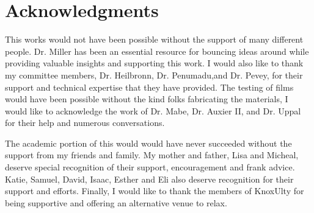 \chapter*{Acknowledgments}

This works would not have been possible without the support of many different people.
Dr. Miller has been an essential resource for bouncing ideas around while providing valuable insights and supporting this work.
I would also like to thank my committee members, Dr. Heilbronn, Dr. Penumadu,and Dr. Pevey, for their support and technical expertise that they have provided. 
The testing of films would have been possible without the kind folks fabricating the materials, I would like to acknowledge the work of Dr. Mabe, Dr. Auxier II, and Dr. Uppal for their help and numerous conversations.

The academic portion of this would would have never succeeded without the support from my friends and family. 
My mother and father, Lisa and Micheal, deserve special recognition of their support, encouragement and frank advice. 
Katie, Samuel, David, Isaac, Esther and Eli also deserve recognition for their support and efforts. 
Finally, I would like to thank the members of KnoxUlty for being supportive and offering an alternative venue to relax.
